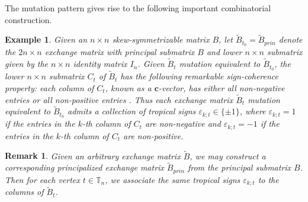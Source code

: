 \documentclass{amsart}
\newtheorem{remark}[theorem]{Remark}
\newtheorem{example}[theorem]{Example}
\numberwithin{equation}{section}
\newcommand{\bfc}{\mathbf{c}}
\newcommand{\bfx}{\mathbf{x}}
\newcommand{\TT}{\mathbb{T}}
\begin{document}
The mutation pattern gives rise to the following important combinatorial construction.
\begin{example}
  Given an $n\times n$ skew-symmetrizable matrix $B$, let $\tilde B_{t_0}=\tilde B_{prin}$ denote the $2n\times n$ exchange matrix with principal submatrix $B$ and lower $n\times n$ submatrix given by the $n\times n$ identity matrix $I_n$.
  Given $\tilde B_t$ mutation equivalent to $\tilde B_{t_0}$, the lower $n\times n$ submatrix $C_t$ of $\tilde B_t$ has the following remarkable \emph{sign-coherence} property: each column of $C_t$, known as a $\bfc$-vector, has either all non-negative entries or all non-positive entries \cite{fomin-zelevinsky4,nakanishi-zelevinsky,gross-hacking-keel-kontsevich}.
  Thus each exchange matrix $\tilde B_t$ mutation equivalent to $\tilde B_{t_0}$ admits a collection of \emph{tropical signs} $\varepsilon_{k;t}\in\{\pm1\}$, where $\varepsilon_{k;t}=1$ if the entries in the $k$-th column of $C_t$ are non-negative and $\varepsilon_{k;t}=-1$ if the entries in the $k$-th column of $C_t$ are non-positive. 
\end{example}

\begin{remark}
  Given an arbitrary exchange matrix $\tilde B$, we may construct a corresponding principalized exchange matrix $\tilde B_{prin}$ from the principal submatrix $B$.
  Then for each vertex $t\in\TT_n$, we associate the same tropical signs $\varepsilon_{k;t}$ to the columns of $\tilde B_t$.
\end{remark}
\end{document}
